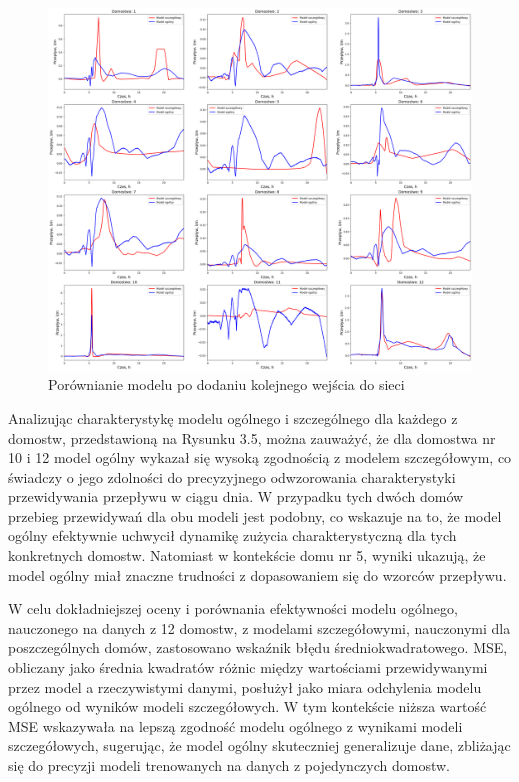 \documentclass[a4paper,twoside,12pt]{book}
\begin{document}
\begin{figure}[!h]
  \centering
  \includegraphics[width=1\textwidth]{img/szczegółowy_ogolny_porówniaie_dodatkowy.png}
  \caption{Porównianie modelu po dodaniu kolejnego wejścia do sieci}
  \label{fig:etykieta-rysunku}
\end{figure}

Analizując charakterystykę modelu ogólnego i szczególnego dla każdego z domostw, przedstawioną na Rysunku 3.5, można zauważyć, że dla domostwa nr 10 i 12 model ogólny wykazał się wysoką zgodnością z modelem szczegółowym, co świadczy o jego zdolności do precyzyjnego odwzorowania charakterystyki przewidywania przepływu w ciągu dnia. W przypadku tych dwóch domów przebieg przewidywań dla obu modeli jest podobny, co wskazuje na to, że model ogólny efektywnie uchwycił dynamikę zużycia charakterystyczną dla tych konkretnych domostw. Natomiast w kontekście domu nr 5, wyniki ukazują, że model ogólny miał znaczne trudności z dopasowaniem się do wzorców przepływu.

W celu dokładniejszej oceny i porównania efektywności modelu ogólnego, nauczonego na danych z 12 domostw, z modelami szczegółowymi, nauczonymi dla poszczególnych domów, zastosowano wskaźnik błędu średniokwadratowego. MSE, obliczany jako średnia kwadratów różnic między wartościami przewidywanymi przez model a rzeczywistymi danymi, posłużył jako miara odchylenia modelu ogólnego od wyników modeli szczegółowych. W tym kontekście niższa wartość MSE wskazywała na lepszą zgodność modelu ogólnego z wynikami modeli szczegółowych, sugerując, że model ogólny skuteczniej generalizuje dane, zbliżając się do precyzji modeli trenowanych na danych z pojedynczych domostw.
\end{document}

